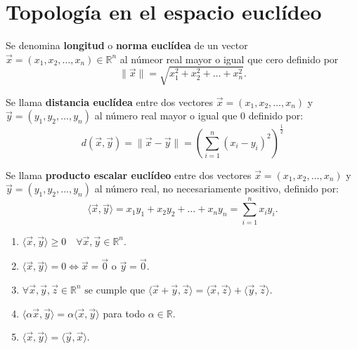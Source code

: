\section{Topología en el espacio euclídeo}
\begin{definición}
    Se denomina \textbf{longitud} o \textbf{norma euclídea} de un vector $\vec{x} = (x_1, x_2, \ldots, x_n) \in \mathbb{R}^n$ al númeor real mayor o igual que cero definido por $$\|\vec{x}\| = \sqrt{x_1^2 + x_2^2 + \ldots + x_n^2}.$$
\end{definición}

\begin{definición}
    Se llama \textbf{distancia euclídea} entre dos vectores $\vec{x} = (x_1, x_2, \ldots, x_n)$ y $\vec{y} = (y_1, y_2, \ldots, y_n)$ al número real mayor o igual que 0 definido por:
    \[
        d(\vec{x}, \vec{y}) = \|\vec{x} - \vec{y}\| = \left( \sum_{i = 1}^{n} (x_i - y_i)^2 \right)^{\frac{1}{2}}
    \]
\end{definición}

\begin{definición}
    Se llama \textbf{producto escalar euclídeo} entre dos vectores $\vec{x} = (x_1, x_2, \ldots, x_n)$ y $\vec{y} = (y_1, y_2, \ldots, y_n)$ al número real, no necesariamente positivo, definido por:
    $$\langle \vec{x}, \vec{y} \rangle = x_1 y_1 + x_2 y_2 + \ldots + x_n y_n = \sum_{i = 1}^{n} x_i y_i.$$
\end{definición}


\begin{teorema}
    \begin{enumerate}
        \item $\langle \vec{x}, \vec{y} \rangle \geq 0 \quad \forall \vec{x}, \vec{y} \in \mathbb{R}^n$.
        \item $\langle \vec{x}, \vec{y} \rangle = 0 \Leftrightarrow \vec{x} = \vec{0}$ o $\vec{y} = \vec{0}$.
        \item $\forall \vec{x}, \vec{y}, \vec{z} \in \mathbb{R}^n \text{ se cumple que } \langle \vec{x} + \vec{y}, \vec{z} \rangle = \langle \vec{x}, \vec{z} \rangle + \langle \vec{y}, \vec{z} \rangle$.
        \item $\langle \alpha \vec{x}, \vec{y} \rangle = \alpha \langle \vec{x}, \vec{y} \rangle$ para todo $\alpha \in \mathbb{R}$.
        \item $\langle \vec{x}, \vec{y} \rangle = \langle \vec{y}, \vec{x} \rangle$.
    \end{enumerate}
\end{teorema}

